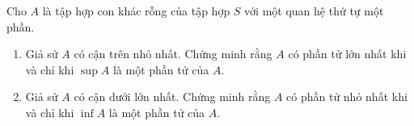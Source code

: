 \begin{exercise}
    Cho $A$ là tập hợp con khác rỗng của tập hợp $S$ với một quan hệ thứ tự một phần.
    \begin{enumerate}[label={(\roman*)}]
        \item Giả sử $A$ có cận trên nhỏ nhất. Chứng minh rằng $A$ có phần tử lớn nhất khi và chỉ khi $\sup A$ là một phần tử của $A$.
        \item Giả sử $A$ có cận dưới lớn nhất. Chứng minh rằng $A$ có phần tử nhỏ nhất khi và chỉ khi $\inf A$ là một phần tử của $A$.
    \end{enumerate}
\end{exercise}
